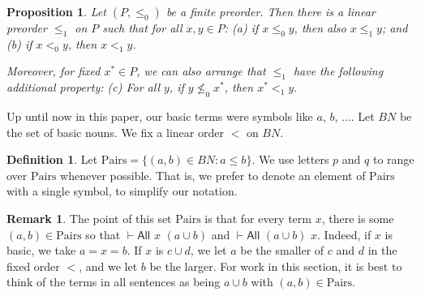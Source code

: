 \documentclass[letterpaper]{article} %
\newtheorem{proposition}[theorem]{Proposition}
\theoremstyle{definition}
\newtheorem{remark}[theorem]{Remark}
\newtheorem{definition}[theorem]{Definition}
\newcommand{\set}[1]{\{ #1 \}}
\newcommand{\proves}{\vdash}
\newcommand{\rem}[1]{\relax}
\newcommand{\All}[2]{\mathsf{All}\,\,#1\,\,#2}
\newcommand{\Pairs}{\mbox{Pairs}}
\begin{document}
{\begin{proposition}
\label{prop-extension}
Let $(P,\leq_0)$ be a finite preorder.  Then there is a linear preorder $\leq_1$ on $P$ 
such that for all $x,y\in P$:
(a) if $x \leq_0 y$, then also $x\leq_1 y$; and 
(b) if $x <_0 y$, then $x <_1 y$.

Moreover, for fixed $x^*\in P$, we can also arrange that $\leq_1$ have the following 
additional property:
(c) For all $y$, if $y \nleq_0 x^*$, then $x^* <_1 y$.
\end{proposition}

\rem{
\footnote{LM: I am not sure that we actually need (d) in Proposition~\ref{prop-extension}.
So \hl{maybe we can drop (d)} both from the statement and the proof.}
}

\rem{\begin{remark}\label{remark-identify}
\marginpar{LM: \textcolor{red}{look}.}
Up until now in this paper, we used letters $a$, $b$, $\ldots$
for basic nouns.  At this point, we need some additional notation.
Let $BN$ be the set of basic nouns.  We fix a linear order $<$ on $BN$.
alone, and we only return to variables in the proof of Theorem~\ref{theorem-completeness-Aunioncard}.
\end{remark}
}

Up until now in this paper, our basic terms were symbols like $a$, $b$, $\ldots$.  
Let $BN$ be the set of basic nouns.  We fix a linear order $<$ on $BN$.

\rem{
At this point, we need to work with an order on basic terms, say $a_1, \ldots, a_n$.  Going further, we will \emph{identify} each basic term $a_i$ with its subscript $i$.  We  represent
binary terms $a_i \cup a_j$ with the pair $(i, j)$.  Similarly, we will represent basic terms $a_i$ with the pair $(i, i)$.  We present our representation lemma exclusively in terms of pairs of numbers, and we only return to ordinary term presentation in the proof of Theorem~\ref{theorem-completeness-Aunioncard}.
}
\begin{definition}
Let $\Pairs = \set{(a,b)\in BN:  a \leq b}$.
 We use letters $p$ and $q$ to range over $\Pairs$ whenever possible.
 That is, we prefer to denote an element of $\Pairs$ with a single symbol,
 to simplify our notation.
\end{definition}

\begin{remark}\label{point-pairs}
The point of this set $\Pairs$ is that 
for every term $x$, there is some $(a,b)\in\Pairs$ so that $\proves \All{x}{(a\cup b)}$
and $\proves \All{(a\cup b)}{x}$.  Indeed, if $x$ is basic, we take $a = x = b$.
If $x$ is $c\cup d$, we let $a$ be the smaller of $c$ and $d$ in the fixed order $<$,
and we let $b$ be the larger.   For work in this section, it is best to think of
the terms in all sentences as being $a\cup b$ with $(a,b)\in\Pairs$.
\end{remark}

}
\end{document}
